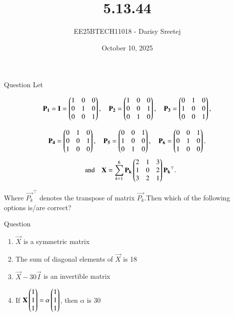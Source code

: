 \documentclass{beamer}
\title %
{5.13.44}
\date{October 10, 2025}
\author %
{EE25BTECH11018 - Darisy Sreetej}
\begin{document}
\frame{\titlepage}

\begin{frame}{Question}
Let  

$$
\mathbf{\mathbf{P_1}} = \mathbf{I} = 
\begin{pmatrix}1 & 0 & 0 \\ 0 & 1 & 0 \\ 0 & 0 & 1\end{pmatrix}, \quad
\mathbf{\mathbf{P_2}} = 
\begin{pmatrix}1 & 0 & 0 \\ 0 & 0 & 1 \\ 0 & 1 & 0\end{pmatrix}, \quad
\mathbf{\mathbf{P_3}} = 
\begin{pmatrix}0 & 1 & 0 \\ 1 & 0 & 0 \\ 0 & 0 & 1\end{pmatrix},
$$

$$
\mathbf{\mathbf{P_4}} = 
\begin{pmatrix}0 & 1 & 0 \\ 0 & 0 & 1 \\ 1 & 0 & 0\end{pmatrix}, \quad
\mathbf{\mathbf{P_5}} = 
\begin{pmatrix}0 & 0 & 1 \\ 1 & 0 & 0 \\ 0 & 1 & 0\end{pmatrix}, \quad
\mathbf{\mathbf{P_6}} = 
\begin{pmatrix}0 & 0 & 1 \\ 0 & 1 & 0 \\ 1 & 0 & 0\end{pmatrix}.
$$
$$
\quad \text{and} \quad
\mathbf{X} = \sum_{k=1}^{6} \mathbf{P_k} \begin{pmatrix}2 & 1 & 3 \\ 1 & 0 & 2 \\ 3 & 2 & 1\end{pmatrix} \mathbf{P_k}^\top.
$$

Where $\vec{P_k}^\top $ denotes the transpose of matrix $ \vec{P_k} $.Then which of the following options is/are correct? 
\end{frame}
\begin{frame}{Question}
    \begin{enumerate}
    \item $\vec{X}$ is a symmetric matrix
    \item The sum of diagonal elements of $\vec{X}$ is 18
    \item $\vec{X} - 30\vec{I}$ is an invertible matrix
    \item If $\mathbf{X}\begin{pmatrix}1\\1\\1\end{pmatrix}=\alpha\begin{pmatrix}1\\1\\1\end{pmatrix}$, then $\alpha$ is 30
\end{enumerate}
\end{frame}
\end{document}
